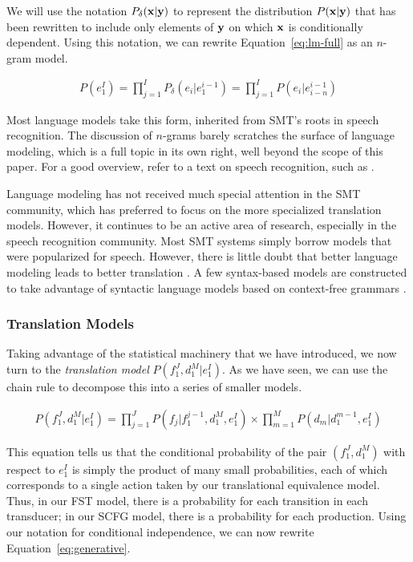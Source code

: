 We will use the notation $P_\delta({\bf x}|{\bf y})$ to represent
the distribution $P({\bf x}|{\bf y})$ that has been rewritten
to include only elements of ${\bf y}$ on which ${\bf x}$ is
conditionally dependent.  Using this notation,
we can rewrite Equation~\ref{eq:lm-full} as an $n$-gram
model.

\begin{align}
P(e_1^I) = \prod_{j=1}^I P_\delta(e_i|e_1^{i-1}) = \prod_{j=1}^I P(e_i|e_{i-n}^{i-1})\label{eq:ngram-lm}
\end{align} 

\noindent Most language models take this form,
inherited from SMT's roots in speech recognition.
The discussion of $n$-grams barely scratches the surface
of language modeling, which is a full topic in its own
right, well beyond the scope of this paper.  
For a good overview, refer to a text on speech
recognition, such as \citet{Jelinek:1998:book}.

Language modeling has not received much 
special attention in the 
SMT community, which has preferred to focus on the more 
specialized translation models.  However, it continues
to be an active area of research, especially in the
speech recognition community.  Most SMT systems simply
borrow models that were popularized for speech.  However,
there is little doubt that better language modeling leads
to better translation
\citep{Eck:2004:lrec,Kirchhoff:2005:wpt,Och:2005:wpt,Zhang:2006:emnlp,Brants:2007:emnlp-conll}.
A few syntax-based models 
are constructed to take advantage of syntactic language
models based on context-free grammars
\citep{Wu:1998:acl,Charniak:2003:mtsummit,Marcu:2006:emnlp}.

\subsubsection{Translation Models}\label{sec:translation-models}

Taking advantage of the statistical machinery that we have
introduced, we now turn to the {\em translation model}
$P(f_1^J,d_1^M|e_1^I)$.  As we have seen, we can use the 
chain rule to decompose this into a series of smaller models.

\begin{align}
P(f_1^J,d_1^M|e_1^I) = \prod_{j=1}^J P(f_j|f_1^{j-1},d_1^M,e_1^I) \times
\prod_{m=1}^M P(d_m|d_1^{m-1},e_1^I) \label{eq:generative}
\end{align} 

\noindent This equation tells us that the conditional probability
of the pair $(f_1^J,d_1^M)$ with respect to $e_1^I$ is
simply the product of many small probabilities, each
of which corresponds to a single action taken by our
translational equivalence model.  Thus, in our FST
model, there is a probability for each transition in
each transducer; in our SCFG model, there is a probability
for each production.  Using our notation for conditional independence,
we can now rewrite Equation~\ref{eq:generative}.

